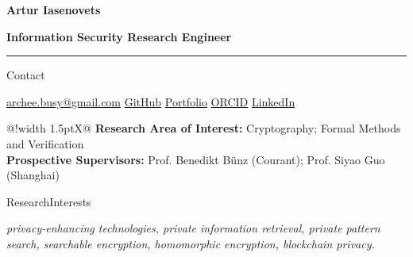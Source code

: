 \documentclass[11pt,a4paper]{article}
\newcommand{\cvrow}[2]{%
  \noindent
  \begin{minipage}[t]{0.145\textwidth}
    \vspace{0pt}%
    \raggedright
    \fontsize{10.5}{12.5}\selectfont
    #1
  \end{minipage}%
  \hfill
  \begin{minipage}[t]{0.835\textwidth}
    \vspace{0pt}%
    #2
  \end{minipage}\par
}
\begin{document}
{\fontsize{24}{28}\selectfont\bfseries Artur Iasenovets}\par
\vspace{0.08em}
{\large\bfseries Information Security Research Engineer}\par
\vspace{0.22em}
\hrule
\vspace{0.55em}

\cvrow{Contact}{%
  \href{mailto:archee.busy@gmail.com}{archee.busy@gmail.com}
  \;\textbullet\;
  \href{https://github.com/iasenovets}{GitHub}
  \;\textbullet\;
  \href{https://iasenovets.github.io/}{Portfolio}
  \;\textbullet\;
  \href{https://orcid.org/0009-0008-0008-3746}{ORCID}
  \;\textbullet\;
  \href{https://linkedin.com/in/iasenovets}{LinkedIn}
}

\vspace{0.55em}

\noindent\hfill
\begin{minipage}[t]{0.835\textwidth}
  \vspace{0pt}%
  \begin{tabularx}{\linewidth}
    {@{}!{\color{linkblue}\vrule width 1.5pt\hspace{0.70em}}X@{}}
    \textbf{Research Area of Interest:} Cryptography; Formal Methods and Verification\\[0.18em]
    \textbf{Prospective Supervisors:} Prof. Benedikt Bünz (Courant); Prof. Siyao Guo (Shanghai)
  \end{tabularx}
\end{minipage}\par

\vspace{0.55em}

\cvrow{Research\newline Interests}{%
  \textit{privacy-enhancing technologies, private information retrieval, private pattern search,
  searchable encryption, homomorphic encryption, blockchain privacy.}
}

\vspace{0.75em}
\end{document}

